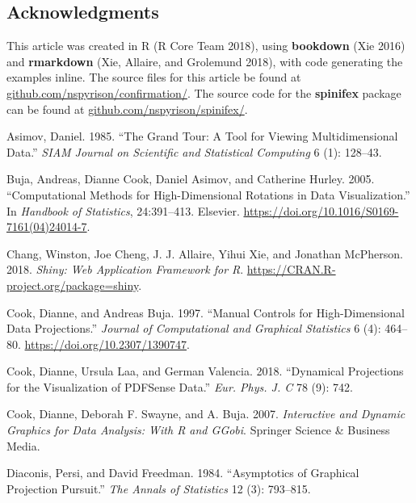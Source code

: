 \hypertarget{acknowledgments}{%
\subsection{Acknowledgments}\label{acknowledgments}}

This article was created in R (R Core Team 2018), using \textbf{bookdown} (Xie 2016) and \textbf{rmarkdown} (Xie, Allaire, and Grolemund 2018), with code generating the examples inline. The source files for this article be found at \href{https://github.com/nspyrison/confirmation/}{github.com/nspyrison/confirmation/}. The source code for the \textbf{spinifex} package can be found at \href{https://github.com/nspyrison/spinifex/}{github.com/nspyrison/spinifex/}.

\hypertarget{refs}{}
\leavevmode\hypertarget{ref-asimov_grand_1985}{}%
Asimov, Daniel. 1985. ``The Grand Tour: A Tool for Viewing Multidimensional Data.'' \emph{SIAM Journal on Scientific and Statistical Computing} 6 (1): 128--43.

\leavevmode\hypertarget{ref-buja_computational_2005}{}%
Buja, Andreas, Dianne Cook, Daniel Asimov, and Catherine Hurley. 2005. ``Computational Methods for High-Dimensional Rotations in Data Visualization.'' In \emph{Handbook of Statistics}, 24:391--413. Elsevier. \url{https://doi.org/10.1016/S0169-7161(04)24014-7}.

\leavevmode\hypertarget{ref-chang_shiny:_2018}{}%
Chang, Winston, Joe Cheng, J. J. Allaire, Yihui Xie, and Jonathan McPherson. 2018. \emph{Shiny: Web Application Framework for R}. \url{https://CRAN.R-project.org/package=shiny}.

\leavevmode\hypertarget{ref-cook_manual_1997}{}%
Cook, Dianne, and Andreas Buja. 1997. ``Manual Controls for High-Dimensional Data Projections.'' \emph{Journal of Computational and Graphical Statistics} 6 (4): 464--80. \url{https://doi.org/10.2307/1390747}.

\leavevmode\hypertarget{ref-cook_dynamical_2018}{}%
Cook, Dianne, Ursula Laa, and German Valencia. 2018. ``Dynamical Projections for the Visualization of PDFSense Data.'' \emph{Eur. Phys. J. C} 78 (9): 742.

\leavevmode\hypertarget{ref-cook_interactive_2007}{}%
Cook, Dianne, Deborah F. Swayne, and A. Buja. 2007. \emph{Interactive and Dynamic Graphics for Data Analysis: With R and GGobi}. Springer Science \& Business Media.

\leavevmode\hypertarget{ref-diaconis_asymptotics_1984}{}%
Diaconis, Persi, and David Freedman. 1984. ``Asymptotics of Graphical Projection Pursuit.'' \emph{The Annals of Statistics} 12 (3): 793--815.

